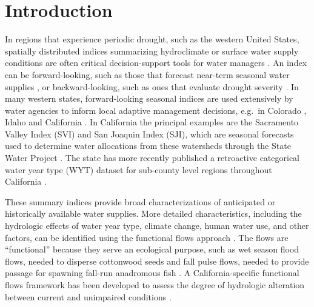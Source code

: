 \documentclass[hess, manuscript]{copernicus}
\begin{document}
\section{Introduction}

In regions that experience periodic drought, such as the western United
States, spatially distributed indices summarizing hydroclimate or
surface water supply conditions are often critical decision-support
tools for water managers \citep[e.g.,][]{Garen1993}. An index can be
forward-looking, such as those that forecast near-term seasonal water
supplies \citep[e.g.,][]{Null2013, Verley2020}, or backward-looking,
such as ones that evaluate drought severity
\citep[e.g.,][]{Palmer1965, Guttman1998a, McKee1993, Wilhite1985, Wilhite2000}.
In many western states, forward-looking seasonal indices are used
extensively by water agencies to inform local adaptive management
decisions, e.g.~in Colorado \citeyearpar[CDWR][]{ColoradoDWR2023}, Idaho
\citeyearpar[NRCS][]{NRCS2023} and California \citep{Null2013}. In
California the principal examples are the Sacramento Valley Index (SVI)
and San Joaquin Index (SJI), which are seasonal forecasts used to
determine water allocations from these watersheds through the State
Water Project \citeyearpar[DWR][]{DWR2022}. The state has more recently
published a retroactive categorical water year type (WYT) dataset for
sub-county level regions throughout California
\citeyearpar[DWR][]{DWR2021a}.

These summary indices provide broad characterizations of anticipated or
historically available water supplies. More detailed characteristics,
including the hydrologic effects of water year type, climate change,
human water use, and other factors, can be identified using the
functional flows approach
\citep[e.g.,][]{Poff1997, Bunn2002, Poff2010, Wheeler2018}. The flows
are ``functional'' because they serve an ecological purpose, such as wet
season flood flows, needed to disperse cottonwood seeds
\citep{Mahoney1998} and fall pulse flows, needed to provide passage for
spawning fall-run anadromous fish \citep{Moyle2002a}. A
California-specific functional flows framework has been developed to
assess the degree of hydrologic alteration between current and
unimpaired conditions \citep{Yarnell2020, Patterson2020}.
\end{document}
